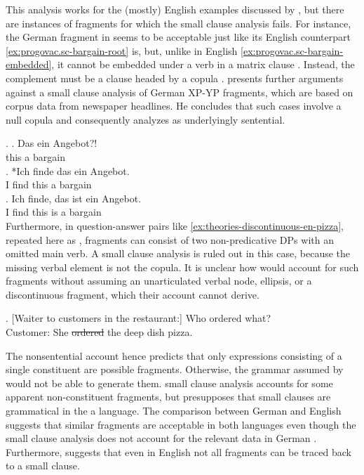This analysis works for the (mostly) English examples discussed by \citet{progovac2006}, but there are instances of fragments for which the small clause analysis fails. For instance, the German fragment in \Next[a] seems to be acceptable just like its English counterpart \ref{ex:progovac.sc-bargain-root} is, but, unlike in English \ref{ex:progovac.sc-bargain-embedded}, it cannot be embedded under a verb in a matrix clause \Next[b]. Instead, the complement must be a clause headed by a copula \Next[c]. \citet{reich2017} presents further arguments against a small clause analysis of German XP-YP fragments, which are based on corpus data from newspaper headlines. He concludes that such cases involve a null copula and consequently analyzes \Next[a] as underlyingly sentential.

\ex. \ag. Das ein Angebot?!\\ 
	  this a bargain\\
     \bg. *Ich finde das ein Angebot.\\
	 I find this a bargain\\
    \cg. Ich finde, das ist ein Angebot.\\
	I find this is a bargain\\

Furthermore, in question-answer pairs like \ref{ex:theories-discontinuous-en-pizza}, repeated here as \Next, fragments can consist of two non-predicative DPs with an omitted main verb. A small clause analysis is ruled out in this case, because the missing verbal element is not the copula. It is unclear how \citet{barton.progovac2005} would account for such fragments without assuming an unarticulated verbal node, ellipsis, or a discontinuous fragment, which their account cannot derive.
 
\ex. [Waiter to customers in the restaurant:] Who ordered what?\\
Customer: She \sout{ordered} the deep dish pizza. 

The nonsentential account hence predicts that only expressions consisting of a single constituent are possible fragments. Otherwise, the grammar assumed by \citet{barton.progovac2005} would not be able to generate them.  small clause analysis accounts for some apparent non-constituent fragments, but presupposes that small clauses are grammatical in the a language. The comparison between German and English suggests that similar fragments are acceptable in both languages even though the small clause analysis does not account for the relevant data in German \citep{reich2017}. Furthermore, \Last suggests that even in English not all fragments can be traced back to a small clause.

